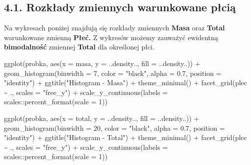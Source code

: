 \documentclass[
  letterpaper,
  DIV=11,
  numbers=noendperiod]{scrartcl}
\newenvironment{Shaded}{\begin{snugshade}}{\end{snugshade}}
\newcommand{\AttributeTok}[1]{\textcolor[rgb]{0.40,0.45,0.13}{#1}}
\newcommand{\DecValTok}[1]{\textcolor[rgb]{0.68,0.00,0.00}{#1}}
\newcommand{\FloatTok}[1]{\textcolor[rgb]{0.68,0.00,0.00}{#1}}
\newcommand{\FunctionTok}[1]{\textcolor[rgb]{0.28,0.35,0.67}{#1}}
\newcommand{\NormalTok}[1]{\textcolor[rgb]{0.00,0.23,0.31}{#1}}
\newcommand{\SpecialCharTok}[1]{\textcolor[rgb]{0.37,0.37,0.37}{#1}}
\newcommand{\StringTok}[1]{\textcolor[rgb]{0.13,0.47,0.30}{#1}}
\begin{document}
\hypertarget{rozkux142ady-zmiennych-warunkowane-pux142ciux105}{%
\subsection{4.1. Rozkłady zmiennych warunkowane
płcią}\label{rozkux142ady-zmiennych-warunkowane-pux142ciux105}}

Na wykresach poniżej znajdują się rozkłady zmiennych \textbf{Masa} oraz
\textbf{Total} warunkowane zmienną \textbf{Płeć.} Z wykresów możemy
zauważyć ewidentną \textbf{bimodalność} zmiennej \textbf{Total} dla
określonej płci.

\begin{Shaded}
\begin{Highlighting}[]
\FunctionTok{ggplot}\NormalTok{(probka, }\FunctionTok{aes}\NormalTok{(}\AttributeTok{x =}\NormalTok{ masa, }\AttributeTok{y =}\NormalTok{ ..density.., }\AttributeTok{fill =}\NormalTok{ ..density..)) }\SpecialCharTok{+}
  \FunctionTok{geom\_histogram}\NormalTok{(}\AttributeTok{binwidth =} \DecValTok{7}\NormalTok{, }\AttributeTok{color =} \StringTok{"black"}\NormalTok{, }\AttributeTok{alpha =} \FloatTok{0.7}\NormalTok{, }\AttributeTok{position =} \StringTok{"identity"}\NormalTok{) }\SpecialCharTok{+}
  \FunctionTok{ggtitle}\NormalTok{(}\StringTok{"Histogram {-} Masa"}\NormalTok{) }\SpecialCharTok{+}
  \FunctionTok{theme\_minimal}\NormalTok{() }\SpecialCharTok{+}
  \FunctionTok{facet\_grid}\NormalTok{(plec }\SpecialCharTok{\textasciitilde{}}\NormalTok{ ., }\AttributeTok{scales =} \StringTok{"free\_y"}\NormalTok{) }\SpecialCharTok{+}
  \FunctionTok{scale\_y\_continuous}\NormalTok{(}\AttributeTok{labels =}\NormalTok{ scales}\SpecialCharTok{::}\FunctionTok{percent\_format}\NormalTok{(}\AttributeTok{scale =} \DecValTok{1}\NormalTok{))}

\FunctionTok{ggplot}\NormalTok{(probka, }\FunctionTok{aes}\NormalTok{(}\AttributeTok{x =}\NormalTok{ total, }\AttributeTok{y =}\NormalTok{ ..density.., }\AttributeTok{fill =}\NormalTok{ ..density..)) }\SpecialCharTok{+}
  \FunctionTok{geom\_histogram}\NormalTok{(}\AttributeTok{binwidth =} \DecValTok{20}\NormalTok{, }\AttributeTok{color =} \StringTok{"black"}\NormalTok{, }\AttributeTok{alpha =} \FloatTok{0.7}\NormalTok{, }\AttributeTok{position =} \StringTok{"identity"}\NormalTok{) }\SpecialCharTok{+}
  \FunctionTok{ggtitle}\NormalTok{(}\StringTok{"Histogram {-} Total"}\NormalTok{) }\SpecialCharTok{+}
  \FunctionTok{theme\_minimal}\NormalTok{() }\SpecialCharTok{+}
  \FunctionTok{facet\_grid}\NormalTok{(plec }\SpecialCharTok{\textasciitilde{}}\NormalTok{ ., }\AttributeTok{scales =} \StringTok{"free\_y"}\NormalTok{) }\SpecialCharTok{+}
  \FunctionTok{scale\_y\_continuous}\NormalTok{(}\AttributeTok{labels =}\NormalTok{ scales}\SpecialCharTok{::}\FunctionTok{percent\_format}\NormalTok{(}\AttributeTok{scale =} \DecValTok{1}\NormalTok{))}
\end{Highlighting}
\end{Shaded}
\end{document}
